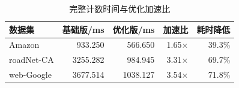 \begin{table}[htbp]
\centering
\small
\caption{完整计数时间与优化加速比}\label{tab:full}
\begin{tabular}{lrrrr}
\toprule
数据集 & 基础版/ms & 优化版/ms & 加速比 & 耗时降低 \\
\midrule
Amazon & 933.250 & 566.650 & 1.65$\times$ & 39.3\% \\
roadNet-CA & 3255.282 & 984.945 & 3.31$\times$ & 69.7\% \\
web-Google & 3677.514 & 1038.127 & 3.54$\times$ & 71.8\% \\
\bottomrule
\end{tabular}
\par{}
\end{table}
